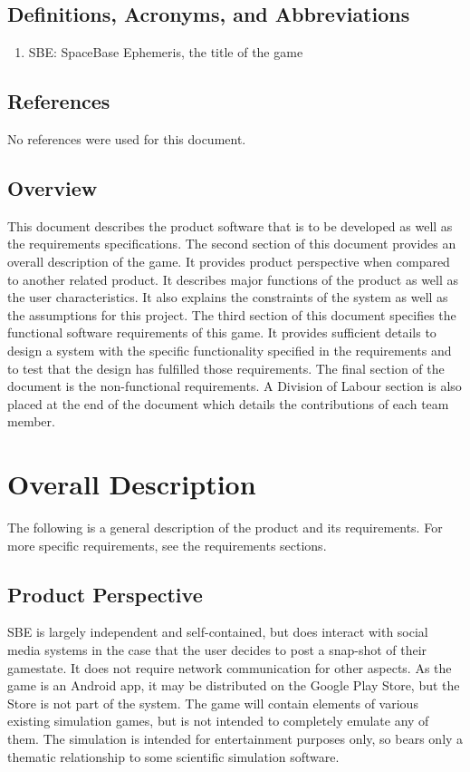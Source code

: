\documentclass[]{article}
\begin{document}
\subsection{Definitions, Acronyms, and Abbreviations}
\label{sub:definitions_acronyms_and_abbreviations}
\begin{enumerate}
	\item SBE: SpaceBase Ephemeris, the title of the game
\end{enumerate}

\subsection{References}
\label{sub:references}
	No references were used for this document.

\subsection{Overview}
\label{sub:overview}
	This document describes the product software that is to be developed as well as the requirements specifications. The second section of this document provides an overall description of the game. It provides product perspective when compared to another related product. It describes major functions of the product as well as the user characteristics. It also explains the constraints of the system as well as the assumptions for this project. The third section of this document specifies the functional software requirements of this game. It provides sufficient details to design a system with the specific functionality specified in the requirements and to test that the design has fulfilled those requirements. The final section of the document is the non-functional requirements. A Division of Labour section is also placed at the end of the document which details the contributions of each team member.


\section{Overall Description}
\label{sec:overall_description}

The following is a general description of the product and its requirements. For more specific requirements, see the requirements sections.

\subsection{Product Perspective}
\label{sub:product_perspective}
	SBE is largely independent and self-contained, but does interact with social media systems in the case that the user decides to post a snap-shot of their gamestate. It does not require network communication for other aspects. As the game is an Android app, it may be distributed on the Google Play Store, but the Store is not part of the system. The game will contain elements of various existing simulation games, but is not intended to completely emulate any of them. The simulation is intended for entertainment purposes only, so bears only a thematic relationship to some scientific simulation software. 
\end{document}
